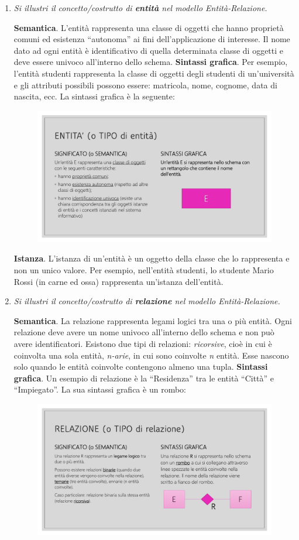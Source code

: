 \documentclass[a4paper]{article}
\newcommand{\dquotes}[1]{``#1''}
\begin{document}
	\begin{enumerate}
		\item \textcolor{Green4}{\emph{Si illustri il concetto/costrutto di \textbf{entità} nel modello Entità-Relazione.}}
		
		\textbf{Semantica}. L'entità rappresenta una classe di oggetti che hanno proprietà comuni ed esistenza \dquotes{autonoma} ai fini dell'applicazione di interesse. Il nome dato ad ogni entità è identificativo di quella determinata classe di oggetti e deve essere univoco all'interno dello schema.\newline
		\textbf{Sintassi grafica}. Per esempio, l'entità studenti rappresenta la classe di oggetti degli studenti di un'università e gli attributi possibili possono essere: matricola, nome, cognome, data di nascita, ecc. La sintassi grafica è la seguente:
		\begin{figure}[!htp]
			\centering
			\includegraphics[width=.3\textwidth]{img/entita_def.pdf}
		\end{figure}
		
		\noindent
		\textbf{Istanza}. L'istanza di un'entità è un oggetto della classe che lo rappresenta e non un unico valore. Per esempio, nell'entità studenti, lo studente Mario Rossi (in carne ed ossa) rappresenta un'istanza dell'entità.
		\newpage
		
		
		\item \textcolor{Green4}{\emph{Si illustri il concetto/costrutto di \textbf{relazione} nel modello Entità-Relazione.}}
		
		\textbf{Semantica}. La relazione rappresenta legami logici tra una o più entità. Ogni relazione deve avere un nome univoco all'interno dello schema e non può avere identificatori. Esistono due tipi di relazioni: \emph{ricorsive}, cioè in cui è coinvolta una sola entità, \emph{n-arie}, in cui sono coinvolte \emph{n} entità. Esse nascono solo quando le entità coinvolte contengono almeno una tupla.\newline
		\textbf{Sintassi grafica}. Un esempio di relazione è la \dquotes{Residenza} tra le entità \dquotes{Città} e \dquotes{Impiegato}. La sua sintassi grafica è un rombo:
		\begin{figure}[!htp]
			\centering
			\includegraphics[width=.5\textwidth]{img/relazione_def.pdf}
		\end{figure}
		

\end{enumerate}
\end{document}
